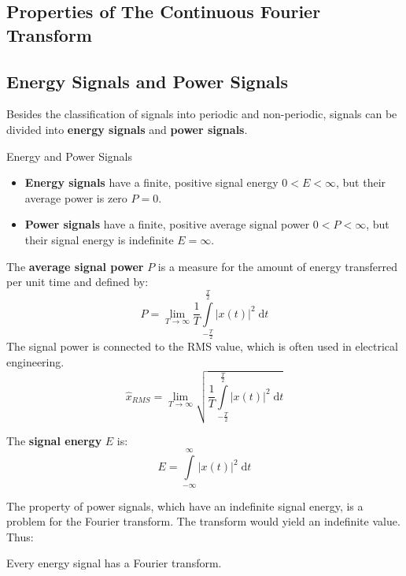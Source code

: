\begin{refsection}
\section{Properties of The Continuous Fourier Transform}

\subsection{Energy Signals and Power Signals}

Besides the classification of signals into periodic and non-periodic, signals can be divided into  \textbf{energy signals} and  \textbf{power signals}.

\begin{definition}{Energy and Power Signals}
	\begin{itemize}
		\item \textbf{Energy signals} have a finite, positive signal energy $0 < E < \infty$, but their average power is zero $P = 0$.
		\item \textbf{Power signals} have a finite, positive average signal power $0 < P < \infty$, but their signal energy is indefinite $E = \infty$.
	\end{itemize}
\end{definition}

The  \textbf{average signal power} $P$ is a measure for the amount of energy transferred per unit time and defined by:
\begin{equation}
	P = \lim\limits_{T \rightarrow \infty} \frac{1}{T} \int\limits_{-\frac{T}{2}}^{\frac{T}{2}} \left|x(t)\right|^2 \; \mathrm{d} t
\end{equation}%
%
The signal power is connected to the \ac{RMS} value, which is often used in electrical engineering.
\begin{equation}
	\hat{x}_{RMS} = \lim\limits_{T \rightarrow \infty} \sqrt{ \frac{1}{T} \int\limits_{-\frac{T}{2}}^{\frac{T}{2}} \left|x(t)\right|^2 \; \mathrm{d} t}
\end{equation}

The  \textbf{signal energy} $E$ is:
\begin{equation}
	E = \int\limits_{-\infty}^{\infty} \left|x(t)\right|^2 \; \mathrm{d} t
\end{equation}%

The property of power signals, which have an indefinite signal energy, is a problem for the Fourier transform. The transform would yield an indefinite value. Thus:
\begin{fact}
	Every energy signal has a Fourier transform.
\end{fact}


\end{refsection}
